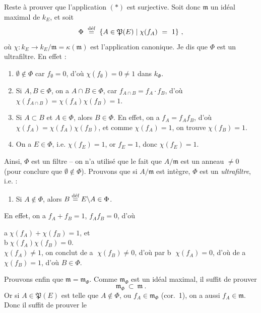 \documentclass[11pt]{article}
\newcommand{\printedpage}[1]{\marginpar{\footnotesize p.~#1}}
\newcommand{\msp}[1]{\marginpar{\footnotesize [#1]}}
\newcommand{\defeq}{\overset{\text{\upshape déf}}{=}}
\begin{document}
\msp{page 6}
\noindent Reste à prouver que l'application $(*)$ est surjective. Soit donc $\mathfrak{m}$ un idéal maximal de $k_E$, et soit
\[
\Phi \ \defeq \ \{A\in\mathfrak{P}(E)\mid\chi(f_A) \ = \ 1\} \ ,
\]
où $\chi : k_E\longrightarrow k_E/\mathfrak{m}=\kappa(\mathfrak{m})$ est l'application canonique. Je dis que $\Phi$ est un ultrafiltre. En effet :
\begin{enumerate}
\item[a)] $\emptyset\notin\Phi$ car $f_\emptyset=0$, d'où $\chi(f_\emptyset)=0\neq1$ dans $k_\Phi$.
\item[b)] Si $A,B\in\Phi$, on a $A\cap B\in\Phi$, car $f_{A\cap B}=f_A\cdot f_B$, d'où $\chi(f_{A\cap B})=\chi(f_A)\chi(f_B)=1$.
\item[c)] Si $A\subset B$ et $A\in\Phi$, alors $B\in\Phi$. En effet, on a $f_A=f_Af_B$, d'où $\chi(f_A)=\chi(f_A)\chi(f_B)$, et comme $\chi(f_A)=1$, on trouve $\chi(f_B)=1$.
\item[d)] On a $E\in\Phi$, i.e. $\chi(f_E)=1$, or $f_E=1$, donc $\chi(f_E)=1$.
\end{enumerate}
Ainsi, $\Phi$ est un filtre -- on n'a utilisé que le fait que $A/\mathfrak{m}$ est un anneau $\neq0$ (pour conclure que $\emptyset\notin\Phi$). Prouvons que si $A/\mathfrak{m}$ est intègre, $\Phi$ est un \textit{ultrafiltre}, i.e. :
\begin{enumerate}
\item[e)] Si $A\notin\Phi$, alors $B\defeq E\backslash A\in\Phi$.
\end{enumerate}
En effet, on a $f_A+f_B=1$, $f_Af_B=0$, d'où

\printedpage{194}

\noindent\hspace*{1em}\textcircled{a}\quad $\chi(f_A)+\chi(f_B)=1$, et\\
\hspace*{1em}\textcircled{b}\quad $\chi(f_A)\chi(f_B)=0$.\\
$\chi(f_A)\neq 1$, on conclut de \textcircled{a} $\chi(f_B)\neq 0$, d'où par \textcircled{b} $\chi(f_A)=0$, d'où de \textcircled{a} $\chi(f_B)=1$, d'où $B\in\Phi$.

\msp{page 7}
Prouvons enfin que $\mathfrak{m}=\mathfrak{m}_\Phi$. Comme $\mathfrak{m}_\Phi$ est un idéal maximal, il suffit de prouver
\[
\mathfrak{m}_\Phi\ \subset\ \mathfrak{m}\ .
\]
Or si $A\in\mathfrak{P}(E)$ est telle que $A\notin\Phi$, ou $f_A\in\mathfrak{m}_\Phi$ (cor.~1), on a aussi $f_A\in\mathfrak{m}$. Donc il suffit de prouver le
\end{document}

